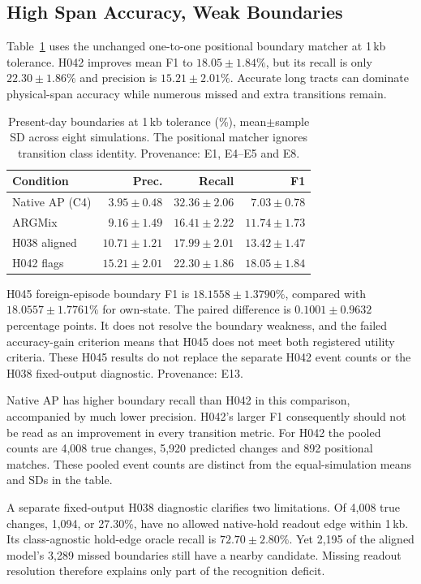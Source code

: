 \documentclass[letterpaper]{article}
\begin{document}
\subsection{High Span Accuracy, Weak Boundaries}
Table~\ref{tab:boundaries} uses the unchanged one-to-one positional boundary matcher at 1\,kb tolerance. H042 improves mean F1 to $18.05\pm1.84\%$, but its recall is only $22.30\pm1.86\%$ and precision is $15.21\pm2.01\%$. Accurate long tracts can dominate physical-span accuracy while numerous missed and extra transitions remain.

\begin{table}[t]
\centering
\small
\begin{tabular}{@{}lrrr@{}}
\toprule
Condition & Prec. & Recall & F1 \\
\midrule
Native AP (C4) & $3.95\pm0.48$ & $32.36\pm2.06$ & $7.03\pm0.78$ \\
ARGMix & $9.16\pm1.49$ & $16.41\pm2.22$ & $11.74\pm1.73$ \\
H038 aligned & $10.71\pm1.21$ & $17.99\pm2.01$ & $13.42\pm1.47$ \\
H042 flags & $15.21\pm2.01$ & $22.30\pm1.86$ & $18.05\pm1.84$ \\
\bottomrule
\end{tabular}
\caption{Present-day boundaries at 1\,kb tolerance (\%), mean$\pm$sample SD across eight simulations. The positional matcher ignores transition class identity. Provenance: E1, E4--E5 and E8.}
\label{tab:boundaries}
\end{table}


H045 foreign-episode boundary F1 is $18.1558\pm1.3790\%$, compared with $18.0557\pm1.7761\%$ for own-state. The paired difference is $0.1001\pm0.9632$ percentage points. It does not resolve the boundary weakness, and the failed accuracy-gain criterion means that H045 does not meet both registered utility criteria. These H045 results do not replace the separate H042 event counts or the H038 fixed-output diagnostic. Provenance: E13.

Native AP has higher boundary recall than H042 in this comparison, accompanied by much lower precision. H042's larger F1 consequently should not be read as an improvement in every transition metric. For H042 the pooled counts are 4,008 true changes, 5,920 predicted changes and 892 positional matches. These pooled event counts are distinct from the equal-simulation means and SDs in the table.

A separate fixed-output H038 diagnostic clarifies two limitations. Of 4,008 true changes, 1,094, or 27.30\%, have no allowed native-hold readout edge within 1\,kb. Its class-agnostic hold-edge oracle recall is $72.70\pm2.80\%$. Yet 2,195 of the aligned model's 3,289 missed boundaries still have a nearby candidate. Missing readout resolution therefore explains only part of the recognition deficit.
\end{document}
